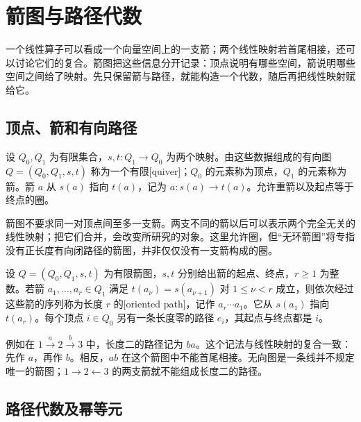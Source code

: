 
\section{箭图与路径代数}
\label{b5:sec:0901}


%
%

一个线性算子可以看成一个向量空间上的一支箭；两个线性映射若首尾相接，还可以讨论它们的复合。箭图把这些信息分开记录：顶点说明有哪些空间，箭说明哪些空间之间给了映射。先只保留箭与路径，就能构造一个代数，随后再把线性映射赋给它。

\subsection{顶点、箭和有向路径}
\label{b5:subsec:0901:01}

\begin{definition}\label{b5:def:quiver}
	设 \(Q_0,Q_1\) 为有限集合，\(s,t:Q_1\to Q_0\) 为两个映射。由这些数据组成的有向图 \(Q=(Q_0,Q_1,s,t)\) 称为一个有限[quiver]；\(Q_0\) 的元素称为顶点，\(Q_1\) 的元素称为箭。箭 \(a\) 从 \(s(a)\) 指向 \(t(a)\)，记为 \(a:s(a)\to t(a)\)。允许重箭以及起点等于终点的圈。
\end{definition}
箭图不要求同一对顶点间至多一支箭。两支不同的箭以后可以表示两个完全无关的线性映射；把它们合并，会改变所研究的对象。这里允许圈，但“无环箭图”将专指没有正长度有向闭路径的箭图，并非仅仅没有一支箭构成的圈。
\begin{definition}\label{b5:def:quiver-path}
	设 \(Q=(Q_0,Q_1,s,t)\) 为有限箭图，\(s,t\) 分别给出箭的起点、终点，\(r\ge1\) 为整数。若箭 \(a_1,\ldots,a_r\in Q_1\) 满足 \(t(a_\nu)=s(a_{\nu+1})\) 对 \(1\le\nu<r\) 成立，则依次经过这些箭的序列称为长度 \(r\) 的[oriented path]，记作 \(a_r\cdots a_1\)。它从 \(s(a_1)\) 指向 \(t(a_r)\)。每个顶点 \(i\in Q_0\) 另有一条长度零的路径 \(e_i\)，其起点与终点都是 \(i\)。
\end{definition}
例如在 \(1\xrightarrow{a}2\xrightarrow{b}3\) 中，长度二的路径记为 \(ba\)。这个记法与线性映射的复合一致：先作 \(a\)，再作 \(b\)。相反，\(ab\) 在这个箭图中不能首尾相接。无向图是一条线并不规定唯一的箭图；\(1\to2\leftarrow3\) 的两支箭就不能组成长度二的路径。

\subsection{路径代数及幂等元}
\label{b5:subsec:0901:02}

